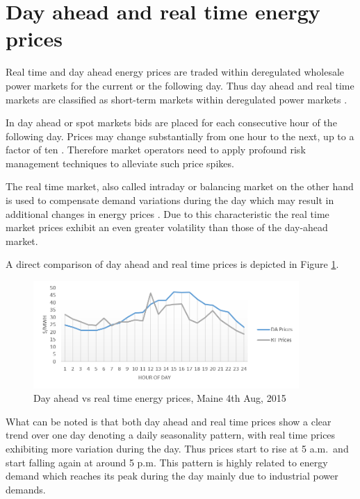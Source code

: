 



\section{Day ahead and real time energy prices} \label{sec:day_ahead_and_real_time_energy_prices}

Real time and day ahead energy prices are traded within deregulated wholesale power markets for the current or the following day. Thus day ahead and real time markets are classified as short-term markets within deregulated power markets \cite{hogan1993competitive}. 

In day ahead or spot markets bids are placed for each consecutive hour of the following day. Prices may change substantially from one hour to the next, up to a factor of ten \cite{huisman2007hourly,weron2004modeling}. Therefore market operators need to apply profound risk management techniques to alleviate such price spikes.

The real time market, also called intraday or balancing market on the other hand is used to compensate demand variations during the day which may result in additional changes in energy prices \cite{barroso2005classification}. 
Due to this characteristic the real time market prices exhibit an even greater volatility than those of the day-ahead market. 

A direct comparison of day ahead and real time prices is depicted in Figure \ref{fig:da_vs_rt_prices_maine}.

\begin{figure}[!htbp]
	\centering
		\includegraphics[width=0.90\textwidth]{figures/data_analysis/day_ahead_vs_real_time_prices.png}
	\caption{Day ahead vs real time energy prices, Maine 4th Aug, 2015}
	\label{fig:da_vs_rt_prices_maine}
\end{figure}

What can be noted is that both day ahead and real time prices show a clear trend over one day denoting a daily seasonality pattern, with real time prices exhibiting more variation during the day. Thus prices start to rise at 5 a.m.~and start falling again at around 5 p.m. This pattern is highly related to energy demand which reaches its peak during the day mainly due to industrial power demands. 

